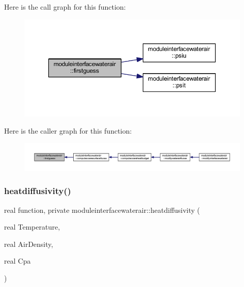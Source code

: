 Here is the call graph for this function\+:\nopagebreak
\begin{figure}[H]
\begin{center}
\leavevmode
\includegraphics[width=350pt]{namespacemoduleinterfacewaterair_ae6acdb7a76bd3e0edd25e31a74d3ab48_cgraph}
\end{center}
\end{figure}
Here is the caller graph for this function\+:\nopagebreak
\begin{figure}[H]
\begin{center}
\leavevmode
\includegraphics[width=350pt]{namespacemoduleinterfacewaterair_ae6acdb7a76bd3e0edd25e31a74d3ab48_icgraph}
\end{center}
\end{figure}
\mbox{\label{namespacemoduleinterfacewaterair_ab0d1bf1d73b112083b7be11d6c22aebc}} 
\subsubsection{\texorpdfstring{heatdiffusivity()}{heatdiffusivity()}}
{\footnotesize\ttfamily real function, private moduleinterfacewaterair\+::heatdiffusivity (\begin{DoxyParamCaption}\item[{real}]{Temperature,  }\item[{real}]{Air\+Density,  }\item[{real}]{Cpa }\end{DoxyParamCaption})\hspace{0.3cm}{\ttfamily [private]}}

